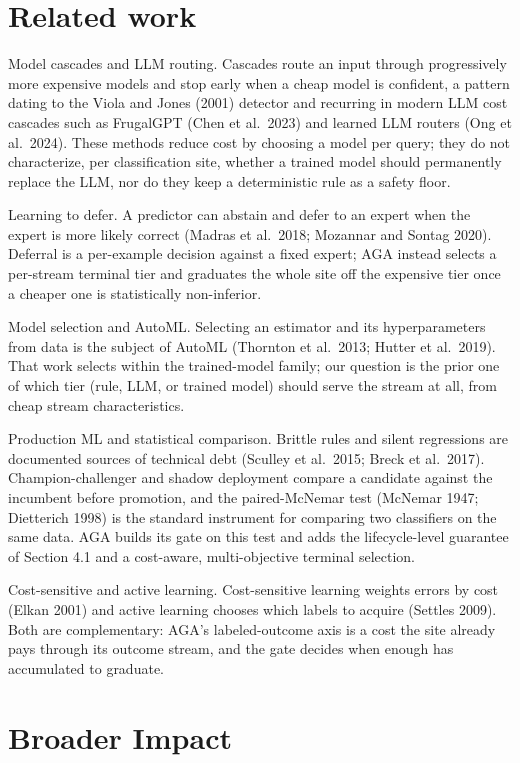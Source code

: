 \section{Related work}\label{related-work}

Model cascades and LLM routing. Cascades route an input through
progressively more expensive models and stop early when a cheap model is
confident, a pattern dating to the Viola and Jones (2001) detector and
recurring in modern LLM cost cascades such as FrugalGPT (Chen et
al.~2023) and learned LLM routers (Ong et al.~2024). These methods
reduce cost by choosing a model per query; they do not characterize, per
classification site, whether a trained model should permanently replace
the LLM, nor do they keep a deterministic rule as a safety floor.

Learning to defer. A predictor can abstain and defer to an expert when
the expert is more likely correct (Madras et al.~2018; Mozannar and
Sontag 2020). Deferral is a per-example decision against a fixed expert;
AGA instead selects a per-stream terminal tier and graduates the whole
site off the expensive tier once a cheaper one is statistically
non-inferior.

Model selection and AutoML. Selecting an estimator and its
hyperparameters from data is the subject of AutoML (Thornton et
al.~2013; Hutter et al.~2019). That work selects within the
trained-model family; our question is the prior one of which tier (rule,
LLM, or trained model) should serve the stream at all, from cheap stream
characteristics.

Production ML and statistical comparison. Brittle rules and silent
regressions are documented sources of technical debt (Sculley et
al.~2015; Breck et al.~2017). Champion-challenger and shadow deployment
compare a candidate against the incumbent before promotion, and the
paired-McNemar test (McNemar 1947; Dietterich 1998) is the standard
instrument for comparing two classifiers on the same data. AGA builds
its gate on this test and adds the lifecycle-level guarantee of Section
4.1 and a cost-aware, multi-objective terminal selection.

Cost-sensitive and active learning. Cost-sensitive learning weights
errors by cost (Elkan 2001) and active learning chooses which labels to
acquire (Settles 2009). Both are complementary: AGA's labeled-outcome
axis is a cost the site already pays through its outcome stream, and the
gate decides when enough has accumulated to graduate.

\section{Broader Impact}\label{broader-impact}

